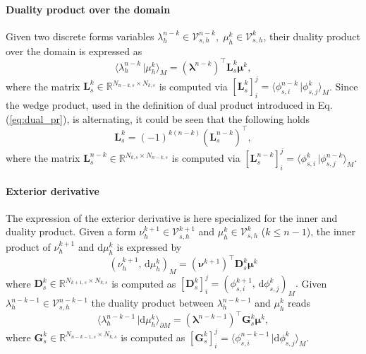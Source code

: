 \documentclass{elsarticle}
\newcommand{\revOne}[1]{{\color{black}#1}}
\newcommand{\revTwo}[1]{{\color{black}#1}}
\renewcommand\d{\ensuremath{\mathrm{d}}}
\newcommand{\inpr}[3][]{\ensuremath{( #2, \, #3 )_{#1}}}
\newcommand{\dualpr}[3][]{\ensuremath{\langle #2 \, \vert #3 \rangle_{#1}}}
\begin{document}
\paragraph{Duality product over the domain}
Given two discrete forms variables $\lambda_h^{n-k} \in \mathcal{V}_{s, h}^{n-k}, \; \mu_h^k \in \mathcal{V}_{s, h}^{k}$, their duality product over the \revOne{domain} is expressed as
\begin{equation}\label{eq:alg_dualpr}
    \dualpr[M]{\lambda_h^{n-k}}{\mu_h^k} = (\bm{\lambda}^{n-k})^\top \mathbf{L}^k_s \bm{\mu}^k,
\end{equation}
where the matrix $\mathbf{L}^k_s \in \mathbb{R}^{N_{n-k, s}\times N_{k, s}}$ is computed via $[\mathbf{L}^k_s]_{i}^j = \dualpr[M]{\phi_{s, i}^{n-k}}{\phi_{s, j}^k}$. Since the wedge product, used in the definition of dual product introduced in Eq.(\ref{eq:dual_pr}), is \revTwo{alternating}, 
it  could be seen that the following holds
\begin{equation}
    \mathbf{L}^k_s = (-1)^{k(n-k)} (\mathbf{L}^{n-k}_s)^\top,
\end{equation}
\revTwo{where the matrix $\mathbf{L}^{n-k}_s \in \mathbb{R}^{N_{k, s}\times N_{n-k, s}}$ is computed via $[\mathbf{L}^{n-k}_s]_{i}^j = \dualpr[M]{\phi_{s, i}^k}{\phi_{s, j}^{n-k}}$.}



\paragraph{Exterior derivative}
The expression of the exterior derivative is here specialized for the inner and duality product. Given a form $\nu_h^{k+1} \in \mathcal{V}_{s, h}^{k+1}$ and $\mu_h^k \in \mathcal{V}_{s, h}^{k}$ ($k\le n-1$), the inner product of $\nu_h^{k+1}$ and $\d \mu_h^k$ is expressed by
\begin{equation}\label{eq:alg_d_inner}
    \inpr[M]{\nu_h^{k+1}}{\d\mu_h^k} = (\bm{\nu}^{k+1})^\top \mathbf{D}^{k}_s \bm{\mu}^{k}
\end{equation}
where $\mathbf{D}^{k}_s \in \mathbb{R}^{N_{k+1, s} \times N_{k, s}}$ is computed as  $[\mathbf{D}^{k}_s]_{i}^j = \inpr[M]{\phi_{s, i}^{k+1}}{\d\phi_{s, j}^{k}}.$ Given $\lambda_h^{n-k-1} \in \mathcal{V}_{s, h}^{n-k-1}$ the duality product between $\lambda_h^{n-k-1}$ and $\mu_h^k$ reads
\begin{equation}\label{eq:alg_d_dualpr}
    \dualpr[\partial M]{\lambda_h^{n-k-1}}{\d \mu_h^k} = (\bm{\lambda}^{n-k-1})^\top \mathbf{G}^k_s \bm{\mu}^k, 
\end{equation}
where $\mathbf{G}^{k}_s \in \mathbb{R}^{N_{n-k-1, s} \times N_{k, s}}$ is computed as  $[\mathbf{G}^{k}_s]_{i}^j = \dualpr[M]{\phi_{s, i}^{n-k-1}}{\d\phi_{s, j}^{k}}.$ 
\end{document}
